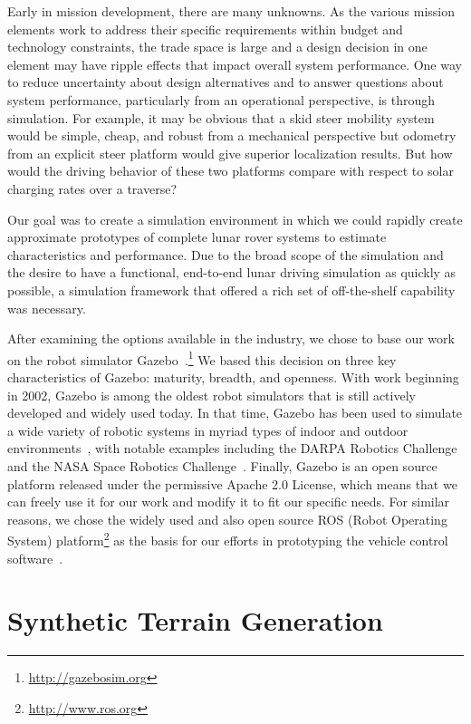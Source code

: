 \documentclass[twocolumn,letterpaper]{IEEEAerospaceCLS}  %
\begin{document}
Early in mission development, there are many unknowns. 
As the various mission elements work to address their specific requirements within budget and technology constraints, the trade space is large and a design decision in one element may have ripple effects that impact overall system performance. 
One way to reduce uncertainty about design alternatives and to answer questions about system performance, particularly from an operational perspective, is through simulation. 
For example, it may be obvious that a skid steer mobility system would be simple, cheap, and robust from a mechanical perspective but odometry from an explicit steer platform would give superior localization results. 
But how would the driving behavior of these two platforms compare with respect to solar charging rates over a traverse? 

Our goal was to create a simulation environment in which we could rapidly create approximate prototypes of complete lunar rover systems to estimate characteristics and performance. 
Due to the broad scope of the simulation and the desire to have a functional, end-to-end lunar driving simulation as quickly as possible, a simulation framework that offered a rich set of off-the-shelf capability was necessary. 

After examining the options available in the industry, we chose to base our work on the robot simulator Gazebo~\cite{koenig2004design}.\footnote{\url{http://gazebosim.org}}
We based this decision on three key characteristics of Gazebo: maturity, breadth, and openness.
With work beginning in 2002, Gazebo is among the oldest robot simulators that is still actively developed and widely used today.
In that time, Gazebo has been used to simulate a wide variety of robotic systems in myriad types of indoor and outdoor environments~\cite{paepcke2016gazebo}, with notable examples including the DARPA Robotics Challenge~\cite{aguero2015inside} and the NASA Space Robotics Challenge~\cite{hambuchen2017nasa}.
Finally, Gazebo is an open source platform released under the permissive Apache 2.0 License, which means that we can freely use it for our work and modify it to fit our specific needs.
For similar reasons, we chose the widely used and also open source ROS (Robot Operating System) platform\footnote{\url{http://www.ros.org}} as the basis for our efforts in prototyping the vehicle control software~\cite{quigley2009ros}.

\section{Synthetic Terrain Generation}
\end{document}
